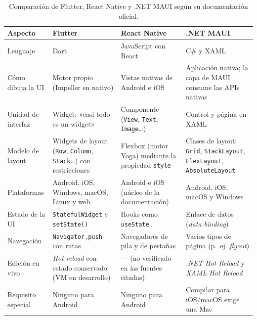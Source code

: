 \begin{table}[H]
	\centering\footnotesize
	\begin{tabularx}{\textwidth}{|p{2.5cm}|X|X|X|}
		\hline
		\rowcolor{tablebackground}\color{white}\textbf{Aspecto} & \color{white}\textbf{Flutter} & \color{white}\textbf{React Native} & \color{white}\textbf{.NET MAUI}\\
		\hline
		Lenguaje & Dart \cite{flutterrn} & JavaScript con React \cite{rncomp} & C\# y XAML \cite{mauiwhat} \\\hline
		Cómo dibuja la UI & Motor propio (Impeller en nativo) \cite{flutterarq} & Vistas nativas de Android e iOS \cite{rncomp} & Aplicación nativa; la capa de MAUI consume las APIs nativas \cite{mauiwhat} \\\hline
		Unidad de interfaz & Widget: «casi todo es un widget» \cite{flutterrn,flutterarq} & Componente (\texttt{View}, \texttt{Text}, \texttt{Image}…) \cite{rncomp} & Control y página en XAML \cite{mauiwhat} \\\hline
		Modelo de layout & Widgets de layout (\texttt{Row}, \texttt{Column}, \texttt{Stack}…) con restricciones \cite{flutterlayout,flutterconstr} & Flexbox (motor Yoga) mediante la propiedad \texttt{style} \cite{rnflex} & Clases de layout: \texttt{Grid}, \texttt{StackLayout}, \texttt{FlexLayout}, \texttt{AbsoluteLayout} \cite{mauilayout} \\\hline
		Plataformas & Android, iOS, Windows, macOS, Linux y web \cite{flutterarq} & Android e iOS (núcleo de la documentación) \cite{rncomp} & Android, iOS, macOS y Windows \cite{mauiwhat} \\\hline
		Estado de la UI & \texttt{StatefulWidget} y \texttt{setState()} \cite{flutterrn} & Hooks como \texttt{useState} \cite{flutterrn} & Enlace de datos (\emph{data binding}) \cite{mauiwhat} \\\hline
		Navegación & \texttt{Navigator.push} con rutas \cite{flutterrn} & Navegadores de pila y de pestañas \cite{flutterrn} & Varios tipos de página (p.~ej. \emph{flyout}) \cite{mauiwhat} \\\hline
		Edición en vivo & \emph{Hot reload} con estado conservado (VM en desarrollo) \cite{flutterarq} & — (no verificado en las fuentes citadas) & \emph{.NET Hot Reload} y \emph{XAML Hot Reload} \cite{mauiwhat} \\\hline
		Requisito especial & Ninguno para Android & Ninguno para Android & Compilar para iOS/macOS exige una Mac \cite{mauiwhat} \\\hline
	\end{tabularx}
	\caption{Comparación de Flutter, React Native y .NET MAUI según su documentación oficial.}
	\label{tab:frameworks}
\end{table}

